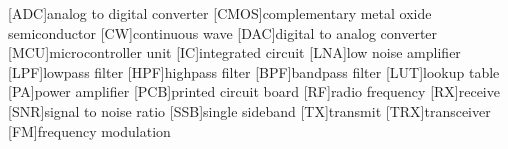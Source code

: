 \setlength{\itemsep}{1ex}
\setlength{\parskip}{0ex}

[ADC]{analog to digital converter}
[CMOS]{complementary metal oxide semiconductor}
[CW]{continuous wave}
[DAC]{digital to analog converter}
[MCU]{microcontroller unit}
[IC]{integrated circuit}
[LNA]{low noise amplifier}
[LPF]{lowpass filter}
[HPF]{highpass filter}
[BPF]{bandpass filter}
[LUT]{lookup table}
[PA]{power amplifier}
[PCB]{printed circuit board}
[RF]{radio frequency}
[RX]{receive}
[SNR]{signal to noise ratio}
[SSB]{single sideband}
[TX]{transmit}
[TRX]{transceiver}
[FM]{frequency modulation}
